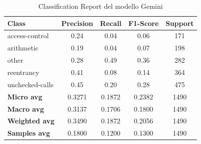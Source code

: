 \documentclass[../../Thesis.tex]{subfiles}
\begin{document}
\begin{table}[H]
    \centering
    \small
    \begin{tabular}{lcccc}
    \hline
    \textbf{Class} & \textbf{Precision} & \textbf{Recall} & \textbf{F1-Score} & \textbf{Support} \\
    \hline
    access-control & 0.24 & 0.04 & 0.06 & 171 \\
    arithmetic & 0.19 & 0.04 & 0.07 & 198 \\
    other & 0.28 & 0.49 & 0.36 & 282 \\
    reentrancy & 0.41 & 0.08 & 0.14 & 364 \\
    unchecked-calls & 0.45 & 0.20 & 0.28 & 475 \\
    \hline
    \textbf{Micro avg} & 0.3271 & 0.1872 & 0.2382 & 1490 \\
    \textbf{Macro avg} & 0.3137 & 0.1706 & 0.1800 & 1490 \\
    \textbf{Weighted avg} & 0.3490 & 0.1872 & 0.2056 & 1490 \\
    \textbf{Samples avg} & 0.1800 & 0.1200 & 0.1300 & 1490 \\
    \hline
    \end{tabular}
    \caption{Classification Report del modello Gemini}
    \end{table}
    
\end{document}

